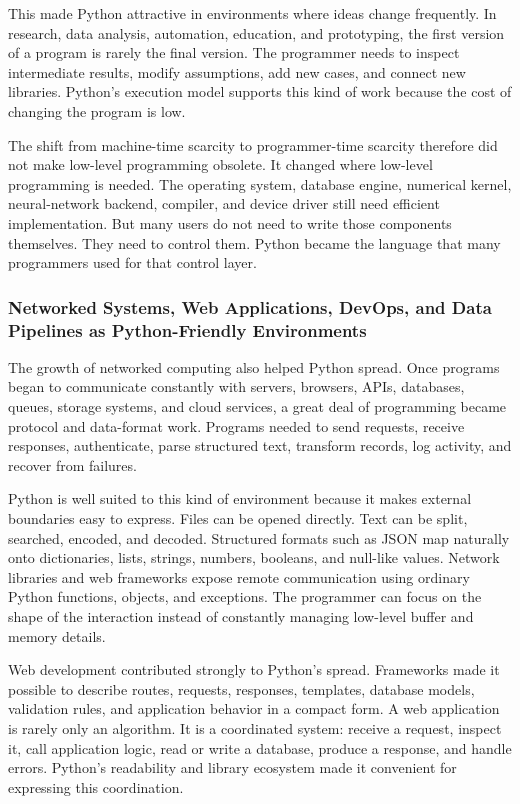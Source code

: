 This made Python attractive in environments where ideas change frequently. In research, data analysis, automation, education, and prototyping, the first version of a program is rarely the final version. The programmer needs to inspect intermediate results, modify assumptions, add new cases, and connect new libraries. Python's execution model supports this kind of work because the cost of changing the program is low.

The shift from machine-time scarcity to programmer-time scarcity therefore did not make low-level programming obsolete. It changed where low-level programming is needed. The operating system, database engine, numerical kernel, neural-network backend, compiler, and device driver still need efficient implementation. But many users do not need to write those components themselves. They need to control them. Python became the language that many programmers used for that control layer.

\subsubsection{Networked Systems, Web Applications, DevOps, and Data Pipelines as Python-Friendly Environments}

The growth of networked computing also helped Python spread. Once programs began to communicate constantly with servers, browsers, APIs, databases, queues, storage systems, and cloud services, a great deal of programming became protocol and data-format work. Programs needed to send requests, receive responses, authenticate, parse structured text, transform records, log activity, and recover from failures.

Python is well suited to this kind of environment because it makes external boundaries easy to express. Files can be opened directly. Text can be split, searched, encoded, and decoded. Structured formats such as JSON map naturally onto dictionaries, lists, strings, numbers, booleans, and null-like values. Network libraries and web frameworks expose remote communication using ordinary Python functions, objects, and exceptions. The programmer can focus on the shape of the interaction instead of constantly managing low-level buffer and memory details.

Web development contributed strongly to Python's spread. Frameworks made it possible to describe routes, requests, responses, templates, database models, validation rules, and application behavior in a compact form. A web application is rarely only an algorithm. It is a coordinated system: receive a request, inspect it, call application logic, read or write a database, produce a response, and handle errors. Python's readability and library ecosystem made it convenient for expressing this coordination.

